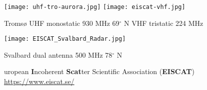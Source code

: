 \begin{frame}[t,fragile]
\frametitle{\hfill}
\vspace{\mytopbit}
\newlength{\picsize}
\setlength{\picsize}{1.1in}

\begin{center}
{
\texttt{[image: uhf-tro-aurora.jpg]}
\texttt{[image: eiscat-vhf.jpg]}

{\scriptsize Troms{\o} UHF monostatic 930 MHz 69$^\circ$ N \hfill VHF tristatic 224 MHz}

\texttt{[image: EISCAT\_Svalbard\_Radar.jpg]}
 
  {\scriptsize Svalbard dual antenna 500 MHz 78$^\circ$ N \hfill}          
}
\end{center}
\vfill
    {uropean {\bf I}ncoherent {\bf Scat}ter Scientific Association ({\bf EISCAT})}
    {\colblack \small \url{https://www.eiscat.se/}}
\end{frame}

